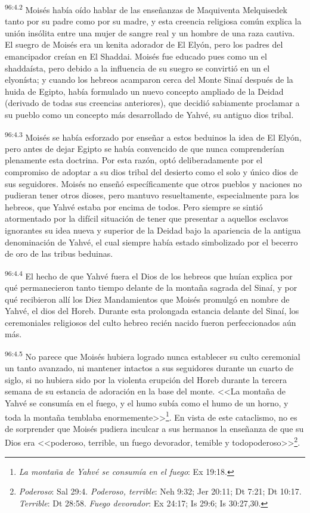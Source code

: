 \par
\textsuperscript{96:4.2} Moisés había oído hablar de las enseñanzas de Maquiventa Melquisedek tanto por su padre como por su madre, y esta creencia religiosa común explica la unión insólita entre una mujer de sangre real y un hombre de una raza cautiva. El suegro de Moisés era un kenita adorador de El Elyón, pero los padres del emancipador creían en El Shaddai. Moisés fue educado pues como un el shaddaísta, pero debido a la influencia de su suegro se convirtió en un el elyonísta; y cuando los hebreos acamparon cerca del Monte Sinaí después de la huida de Egipto, había formulado un nuevo concepto ampliado de la Deidad (derivado de todas sus creencias anteriores), que decidió sabiamente proclamar a su pueblo como un concepto más desarrollado de Yahvé, su antiguo dios tribal.

\par
\textsuperscript{96:4.3} Moisés se había esforzado por enseñar a estos beduinos la idea de El Elyón, pero antes de dejar Egipto se había convencido de que nunca comprenderían plenamente esta doctrina. Por esta razón, optó deliberadamente por el compromiso de adoptar a su dios tribal del desierto como el solo y único dios de sus seguidores. Moisés no enseñó específicamente que otros pueblos y naciones no pudieran tener otros dioses, pero mantuvo resueltamente, especialmente para los hebreos, que Yahvé estaba por encima de todos. Pero siempre se sintió atormentado por la difícil situación de tener que presentar a aquellos esclavos ignorantes su idea nueva y superior de la Deidad bajo la apariencia de la antigua denominación de Yahvé, el cual siempre había estado simbolizado por el becerro de oro de las tribus beduinas.

\par
\textsuperscript{96:4.4} El hecho de que Yahvé fuera el Dios de los hebreos que huían explica por qué permanecieron tanto tiempo delante de la montaña sagrada del Sinaí, y por qué recibieron allí los Diez Mandamientos que Moisés promulgó en nombre de Yahvé, el dios del Horeb. Durante esta prolongada estancia delante del Sinaí, los ceremoniales religiosos del culto hebreo recién nacido fueron perfeccionados aún más.

\par
\textsuperscript{96:4.5} No parece que Moisés hubiera logrado nunca establecer su culto ceremonial un tanto avanzado, ni mantener intactos a sus seguidores durante un cuarto de siglo, si no hubiera sido por la violenta erupción del Horeb durante la tercera semana de su estancia de adoración en la base del monte. <<La montaña de Yahvé se consumía en el fuego, y el humo subía como el humo de un horno, y toda la montaña temblaba enormemente>>\footnote{\textit{La montaña de Yahvé se consumía en el fuego}: Ex 19:18.}. En vista de este cataclismo, no es de sorprender que Moisés pudiera inculcar a sus hermanos la enseñanza de que su Dios era <<poderoso, terrible, un fuego devorador, temible y todopoderoso>>\footnote{\textit{Poderoso}: Sal 29:4. \textit{Poderoso, terrible}: Neh 9:32; Jer 20:11; Dt 7:21; Dt 10:17. \textit{Terrible}: Dt 28:58. \textit{Fuego devorador}: Ex 24:17; Is 29:6; Is 30:27,30.}.

